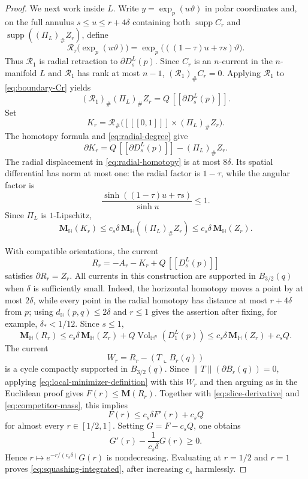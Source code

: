 \documentclass[11pt,reqno]{amsart}
\numberwithin{equation}{section}
\theoremstyle{definition}
\theoremstyle{remark}
\newcommand{\Hyp}{\mathbb H}
\newcommand{\Mass}{\mathbf M}
\newcommand{\supp}{\operatorname{supp}}
\newcommand{\restr}{\mathbin{\llcorner}}
\newcommand{\cur}[1]{\left[\!\left[#1\right]\!\right]}
\begin{document}
\begin{proof}
We next work inside $L$.  Write
$y=\exp_p(u\vartheta)$ in polar coordinates and, on the full annulus
$s\le u\le r+4\delta$ containing both $\supp C_r$ and
$\supp((\Pi_L)_\#Z_r)$, define
\begin{equation}\label{eq:radial-homotopy}
 \mathcal R_\tau\bigl(\exp_p(u\vartheta)\bigr)
 =\exp_p\bigl(((1-\tau)u+\tau s)\vartheta\bigr).
\end{equation}
Thus $\mathcal R_1$ is radial retraction to $\partial D_s^L(p)$.  Since
$C_r$ is an $n$-current in the $n$-manifold $L$ and
$\mathcal R_1$ has rank at most $n-1$,
$(\mathcal R_1)_\#C_r=0$.  Applying $\mathcal R_1$ to
\eqref{eq:boundary-Cr} yields
\begin{equation}\label{eq:radial-degree}
 (\mathcal R_1)_\#(\Pi_L)_\#Z_r
 =Q\,\cur{\partial D_s^L(p)}.
\end{equation}
Set
\[
 K_r=\mathcal R_\#\bigl(\cur{[0,1]}\times(\Pi_L)_\#Z_r\bigr).
\]
The homotopy formula and \eqref{eq:radial-degree} give
\begin{equation}\label{eq:Kr-boundary}
 \partial K_r=Q\,\cur{\partial D_s^L(p)}-(\Pi_L)_\#Z_r.
\end{equation}
The radial displacement in \eqref{eq:radial-homotopy} is at most
$8\delta$.  Its spatial differential has norm at most one: the radial factor
is $1-\tau$, while the angular factor is
\[
 \frac{\sinh((1-\tau)u+\tau s)}{\sinh u}\le1.
\]
Since $\Pi_L$ is $1$-Lipschitz,
\begin{equation}\label{eq:Kr-mass}
 \Mass_{\Hyp}(K_r)
 \le c_s\delta\,\Mass_{\Hyp}((\Pi_L)_\#Z_r)
 \le c_s\delta\,\Mass_{\Hyp}(Z_r).
\end{equation}

With compatible orientations, the current
\[
 R_r=-A_r-K_r+Q\,\cur{D_s^L(p)}
\]
satisfies $\partial R_r=Z_r$.  All currents in this construction are
supported in $B_{3/2}(q)$ when $\delta$ is sufficiently small.  Indeed,
the horizontal homotopy moves a point by at most $2\delta$, while every
point in the radial homotopy has distance at most $r+4\delta$ from $p$;
using $d_{\Hyp}(p,q)\le2\delta$ and $r\le1$ gives the assertion after fixing,
for example, $\delta_*<1/12$.  Since
$s\le1$,
\begin{equation}\label{eq:competitor-mass}
 \Mass_{\Hyp}(R_r)
 \le c_s\delta\,\Mass_{\Hyp}(Z_r)
     +Q\operatorname{Vol}_{\Hyp^n}(D_1^L(p))
 \le c_s\delta\,\Mass_{\Hyp}(Z_r)+c_sQ.
\end{equation}
The current
\[
 W_r=R_r-(T\restr B_r(q))
\]
is a cycle compactly supported in $B_{3/2}(q)$.  Since
$\|T\|(\partial B_r(q))=0$, applying
\eqref{eq:local-minimizer-definition} with this $W_r$ and then arguing as in
the Euclidean proof gives $F(r)\le\Mass(R_r)$.  Together with
\eqref{eq:slice-derivative} and
\eqref{eq:competitor-mass}, this implies
\begin{equation}\label{eq:differential-squashing}
 F(r)\le c_s\delta F'(r)+c_sQ
\end{equation}
for almost every $r\in[1/2,1]$.  Setting $G=F-c_sQ$, one obtains
\[
 G'(r)-\frac{1}{c_s\delta}G(r)\ge0.
\]
Hence $r\mapsto e^{-r/(c_s\delta)}G(r)$ is nondecreasing.  Evaluating at
$r=1/2$ and $r=1$ proves \eqref{eq:squashing-integrated}, after increasing
$c_s$ harmlessly.
\end{proof}
\end{document}
